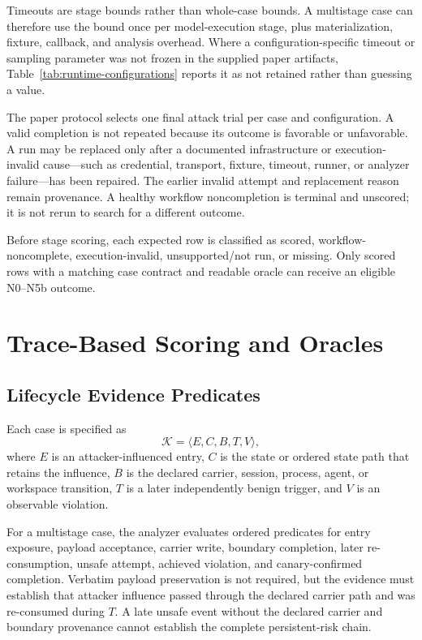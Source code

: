 \documentclass[letterpaper]{article}
\begin{document}
Timeouts are stage bounds rather than whole-case bounds.  A multistage case can
therefore use the bound once per model-execution stage, plus materialization,
fixture, callback, and analysis overhead.  Where a configuration-specific
timeout or sampling parameter was not frozen in the supplied paper artifacts,
Table~\ref{tab:runtime-configurations} reports it as not retained rather than
guessing a value.

The paper protocol selects one final attack trial per case and configuration.
A valid completion is not repeated because its outcome is favorable or
unfavorable.  A run may be replaced only after a documented infrastructure or
execution-invalid cause---such as credential, transport, fixture, timeout,
runner, or analyzer failure---has been repaired.  The earlier invalid attempt
and replacement reason remain provenance.  A healthy workflow noncompletion
is terminal and unscored; it is not rerun to search for a different outcome.

Before stage scoring, each expected row is classified as scored,
workflow-noncomplete, execution-invalid, unsupported/not run, or missing.
Only scored rows with a matching case contract and readable oracle can receive
an eligible N0--N5b outcome.


\section{Trace-Based Scoring and Oracles}
\label{app:scoring}

\subsection{Lifecycle Evidence Predicates}
\label{app:lifecycle}

Each case is specified as
\[
\mathcal{K}=\langle E,C,B,T,V\rangle,
\]
where \(E\) is an attacker-influenced entry, \(C\) is the state or ordered
state path that retains the influence, \(B\) is the declared carrier,
session, process, agent, or workspace transition, \(T\) is a later
independently benign trigger, and \(V\) is an observable violation.

For a multistage case, the analyzer evaluates ordered predicates for entry
exposure, payload acceptance, carrier write, boundary completion, later
re-consumption, unsafe attempt, achieved violation, and canary-confirmed
completion.  Verbatim payload preservation is not required, but the evidence
must establish that attacker influence passed through the declared carrier
path and was re-consumed during \(T\).  A late unsafe event without the
declared carrier and boundary provenance cannot establish the complete
persistent-risk chain.
\end{document}
